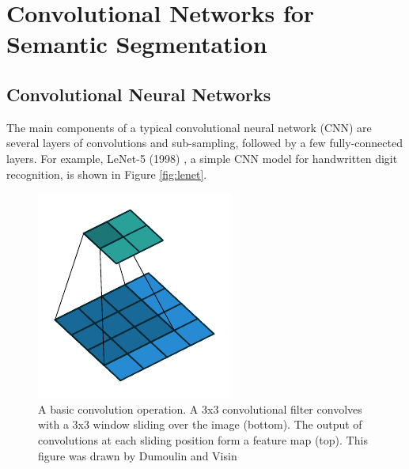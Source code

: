


\section{Convolutional Networks for Semantic Segmentation}
\label{sec:cnn4seg}

\subsection{Convolutional Neural Networks}
\label{subsec:cnn}


The main components of a typical convolutional neural network (CNN) are several layers of convolutions and sub-sampling, followed by a few fully-connected layers.
For example, LeNet-5 (1998) \cite{lecun1998gradient}, a simple CNN model for handwritten digit recognition, is shown in Figure \ref{fig:lenet}.



\begin{figure}[t]
\centering
   \includegraphics[width=\linewidth]{img/no_padding_no_strides_00.pdf}
\caption{
A basic convolution operation.
A 3x3 convolutional filter convolves with a 3x3 window sliding over the image (bottom).
The output of convolutions at each sliding position form a feature map (top).
This figure was drawn by Dumoulin and Visin \cite{dumoulin2016guide}
}
\label{fig:conv}
\end{figure}

